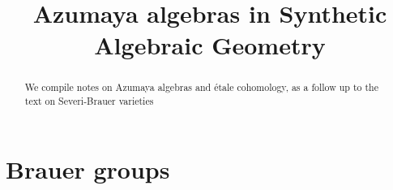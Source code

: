 \documentclass{../util/zariski}
\title{Azumaya algebras in Synthetic Algebraic Geometry}
\begin{document}
\maketitle

\begin{abstract}
We compile notes on Azumaya algebras and \'etale cohomology, as a follow up to the text on Severi-Brauer varieties
\end{abstract}


\tableofcontents

\section{Brauer groups}



\printindex

\printbibliography
\end{document}
